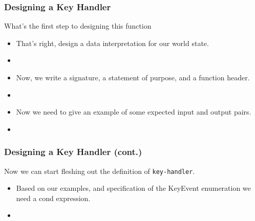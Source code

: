 \documentclass{beamer}
\begin{document}



\begin{frame}
  \frametitle{Designing a Key Handler}
  What's the first step to designing this function
  \begin{itemize}
  \item<2->That's right, design a data interpretation for our world state.
  \item<3-> \keInterp
  \item<4-> Now, we write a signature, a statement of purpose, and a 
    function header.
  \item<5-> \keHeader
  \item<6-> Now we need to give an example of some expected input and output pairs.
  \item<7-> \keTests
  \end{itemize}
\end{frame}


\begin{frame}
  \frametitle{Designing a Key Handler (cont.)}
  Now we can start fleshing out the definition of \texttt{key-handler}.
  \begin{itemize}
  \item<2-> Based on our examples, and specification of
    the KeyEvent enumeration we need a cond expression.
  \item<3-> \keDef
  \end{itemize}
\end{frame}
\end{document}
